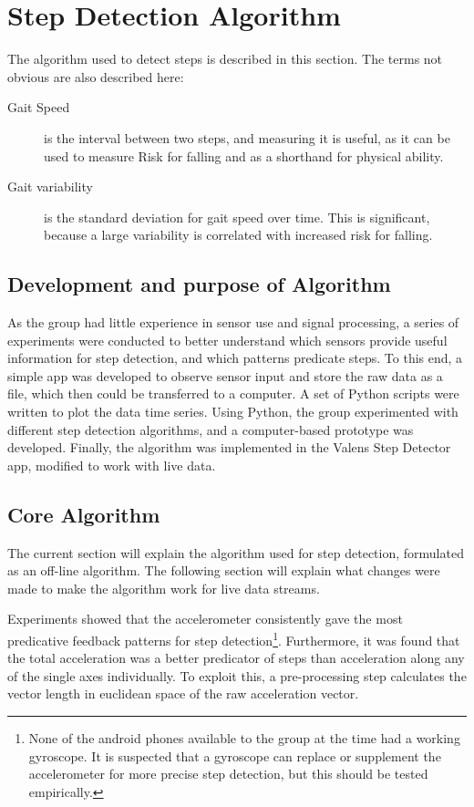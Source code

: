 \section{Step Detection Algorithm}
The algorithm used to detect steps is described in this section. The terms not obvious are also described here:
\begin{description}
\item[Gait Speed] is the interval between two steps, and measuring it is useful, as it can be used to measure Risk for falling and as a shorthand for physical ability.
\item[Gait variability] is the standard deviation for gait speed over time. This is significant, because a large variability is correlated with increased risk for falling.
\end{description}
\subsection{Development and purpose of Algorithm}
As the group had little experience in sensor use and signal processing, a series of experiments were conducted to better understand which sensors provide useful information for step detection, and which patterns predicate steps. To this end, a simple app was developed to observe sensor input and store the raw data as a file, which then could be transferred to a computer. A set of Python scripts were written to plot  the data time series. Using Python, the group experimented with different step detection algorithms, and a computer-based prototype was developed. Finally, the algorithm was implemented in the Valens Step Detector app, modified to work with live data.

\subsection{Core Algorithm}\label{def:coreAlgorithm}
The current section will explain the algorithm used for step detection, formulated as an off-line algorithm. The following section will explain what changes were made to make the algorithm work for live data streams.

Experiments showed that the accelerometer consistently gave the most predicative feedback patterns for step detection\footnote{None of the android phones available to the group at the time had a working gyroscope. It is suspected that a gyroscope can replace or supplement the accelerometer for more precise step detection, but this should be tested empirically.}. Furthermore, it was found that the total acceleration was a better predicator of steps than acceleration along any of the single axes individually. To exploit this, a pre-processing step calculates the vector length in euclidean space of the raw acceleration vector.

